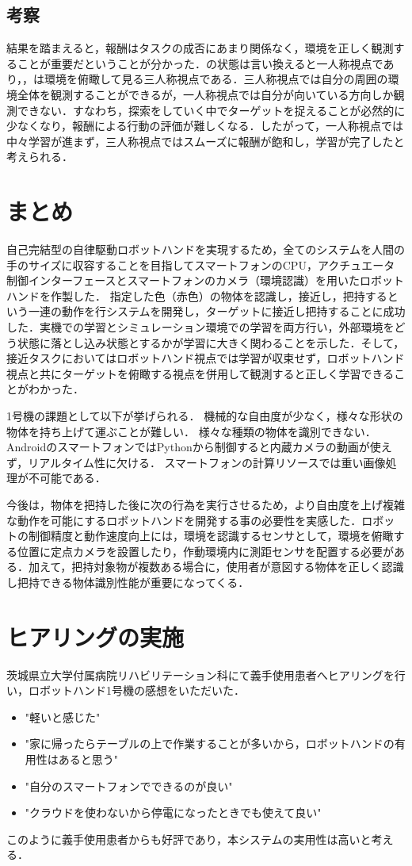 \subsection{考察}
結果を踏まえると，報酬はタスクの成否にあまり関係なく，環境を正しく観測することが重要だということが分かった．の状態は言い換えると一人称視点であり，，は環境を俯瞰して見る三人称視点である．三人称視点では自分の周囲の環境全体を観測することができるが，一人称視点では自分が向いている方向しか観測できない．すなわち，探索をしていく中でターゲットを捉えることが必然的に少なくなり，報酬による行動の評価が難しくなる．したがって，一人称視点では中々学習が進まず，三人称視点ではスムーズに報酬が飽和し，学習が完了したと考えられる．


\section{まとめ}
自己完結型の自律駆動ロボットハンドを実現するため，全てのシステムを人間の手のサイズに収容することを目指してスマートフォンのCPU，アクチュエータ制御インターフェースとスマートフォンのカメラ（環境認識）を用いたロボットハンドを作製した．
指定した色（赤色）の物体を認識し，接近し，把持するという一連の動作を行システムを開発し，ターゲットに接近し把持することに成功した．実機での学習とシミュレーション環境での学習を両方行い，外部環境をどう状態に落とし込み状態とするかが学習に大きく関わることを示した．そして，接近タスクにおいてはロボットハンド視点では学習が収束せず，ロボットハンド視点と共にターゲットを俯瞰する視点を併用して観測すると正しく学習できることがわかった．

1号機の課題として以下が挙げられる．
機械的な自由度が少なく，様々な形状の物体を持ち上げて運ぶことが難しい．
様々な種類の物体を識別できない．
AndroidのスマートフォンではPythonから制御すると内蔵カメラの動画が使えず，リアルタイム性に欠ける．
スマートフォンの計算リソースでは重い画像処理が不可能である．

今後は，物体を把持した後に次の行為を実行させるため，より自由度を上げ複雑な動作を可能にするロボットハンドを開発する事の必要性を実感した．ロボットの制御精度と動作速度向上には，環境を認識するセンサとして，環境を俯瞰する位置に定点カメラを設置したり，作動環境内に測距センサを配置する必要がある．加えて，把持対象物が複数ある場合に，使用者が意図する物体を正しく認識し把持できる物体識別性能が重要になってくる．


\section{ヒアリングの実施}
茨城県立大学付属病院リハビリテーション科にて義手使用患者へヒアリングを行い，ロボットハンド1号機の感想をいただいた．
\begin{itemize}
    \item "軽いと感じた"
    \item "家に帰ったらテーブルの上で作業することが多いから，ロボットハンドの有用性はあると思う"
    \item "自分のスマートフォンでできるのが良い"
    \item "クラウドを使わないから停電になったときでも使えて良い"
\end{itemize}
このように義手使用患者からも好評であり，本システムの実用性は高いと考える．

